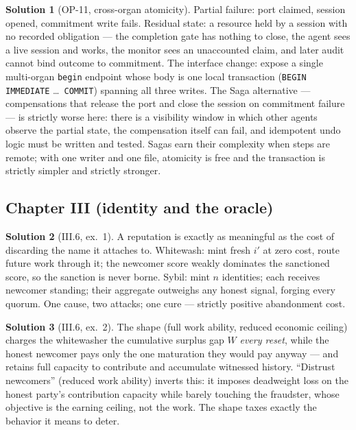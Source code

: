 \documentclass[11pt,a4paper]{article}
\theoremstyle{definition}
\newtheorem{sol}{Solution}
\theoremstyle{remark}
\begin{document}
\begin{sol}[OP-11, cross-organ atomicity]
Partial failure: port claimed, session opened, commitment write fails. Residual state: a resource held by a session with no recorded obligation --- the completion gate has nothing to close, the agent sees a live session and works, the monitor sees an unaccounted claim, and later audit cannot bind outcome to commitment. The interface change: expose a single multi-organ \texttt{begin} endpoint whose body is one local transaction (\texttt{BEGIN IMMEDIATE} \dots\ \texttt{COMMIT}) spanning all three writes. The Saga alternative --- compensations that release the port and close the session on commitment failure --- is strictly worse here: there is a visibility window in which other agents observe the partial state, the compensation itself can fail, and idempotent undo logic must be written and tested. Sagas earn their complexity when steps are remote; with one writer and one file, atomicity is free and the transaction is strictly simpler and strictly stronger.
\end{sol}

\subsection{Chapter III (identity and the oracle)}

\begin{sol}[III.6, ex.\ 1]
A reputation is exactly as meaningful as the cost of discarding the name it attaches to. Whitewash: mint fresh $i'$ at zero cost, route future work through it; the newcomer score weakly dominates the sanctioned score, so the sanction is never borne. Sybil: mint $n$ identities; each receives newcomer standing; their aggregate outweighs any honest signal, forging every quorum. One cause, two attacks; one cure --- strictly positive abandonment cost.
\end{sol}

\begin{sol}[III.6, ex.\ 2]
The shape (full work ability, reduced economic ceiling) charges the whitewasher the cumulative surplus gap $W$ \emph{every reset}, while the honest newcomer pays only the one maturation they would pay anyway --- and retains full capacity to contribute and accumulate witnessed history. ``Distrust newcomers'' (reduced work ability) inverts this: it imposes deadweight loss on the honest party's contribution capacity while barely touching the fraudster, whose objective is the earning ceiling, not the work. The shape taxes exactly the behavior it means to deter.
\end{sol}
\end{document}
